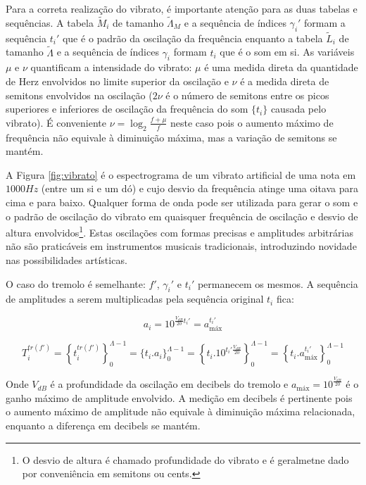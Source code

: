 Para a correta realização do vibrato, é importante atenção para as duas tabelas e sequências.
A tabela $\widetilde{M}_i$ de tamanho $\widetilde{\Lambda}_M$ e a sequência de índices $\gamma_i'$ formam a sequência $t_i'$
 que é o padrão da oscilação da frequência enquanto
a tabela $\widetilde{L}_i$ de tamanho $\widetilde{\Lambda}$ e a sequência de índices $\gamma_i$ formam $t_i$ que é o som em si.
As variáveis $\mu$ e $\nu$ quantificam a intensidade do vibrato: $\mu$ é uma medida direta da quantidade
de Herz envolvidos no limite superior da oscilação e $\nu$ é a medida direta de semitons envolvidos na oscilação ($2\nu$ é o número de semitons entre os picos superiores e inferiores de oscilação da frequência do som $\{t_i\}$ causada pelo vibrato).
É conveniente $\nu=\log_{2}\frac{f+\mu}{f} $ neste caso pois o aumento máximo de frequência
não equivale à diminuição máxima, mas a variação de semitons se mantém.

A Figura \ref{fig:vibrato} é o espectrograma de um vibrato artificial de uma nota em
$1000Hz$ (entre um si e um dó) e cujo desvio da frequência atinge uma oitava
para cima e para baixo. Qualquer forma de onda pode
ser utilizada para gerar o som e o padrão de oscilação do vibrato
em quaisquer frequência de oscilação e desvio de altura envolvidos\footnote{O desvio de altura
é chamado profundidade do vibrato e é geralmetne dado por conveniência em semitons ou cents.}. Estas oscilações com formas precisas e amplitudes arbitrárias não são praticáveis em instrumentos musicais tradicionais, introduzindo novidade nas possibilidades artísticas.

O caso do tremolo é semelhante: $f'$, $\gamma_i'$ e $t_i'$ permanecem os mesmos.
A sequência de amplitudes a serem multiplicadas pela sequência original $t_i$ fica:

\begin{equation}\label{trA}
a_i=10^{\frac{V_{dB}}{20}t_i' } = a_{\text{máx}}^{t_i'}
\end{equation}

\begin{equation}\label{trT}
T_i^{tr(f')}=\left \{ t_i^{tr(f')} \right \}_0^{\Lambda-1}=\{ t_i . a_i \}_0^{\Lambda-1}=\left \{t_i .10^{t_i' \frac{V_{dB}}{20}}    \right \}_0^{\Lambda-1}=\left\{t_i . a_{\text{máx}}^{t_i'} \right\}_0^{\Lambda-1}
\end{equation}

Onde $V_{dB}$ é a profundidade da oscilação em decibels do tremolo e $a_{\text{máx}}=10^{\frac{V_{dB}}{20}}$
 é o ganho máximo de amplitude envolvido.
A medição em decibels é pertinente pois o aumento máximo de amplitude
não equivale à diminuição máxima relacionada, enquanto a diferença em decibels se mantém.

